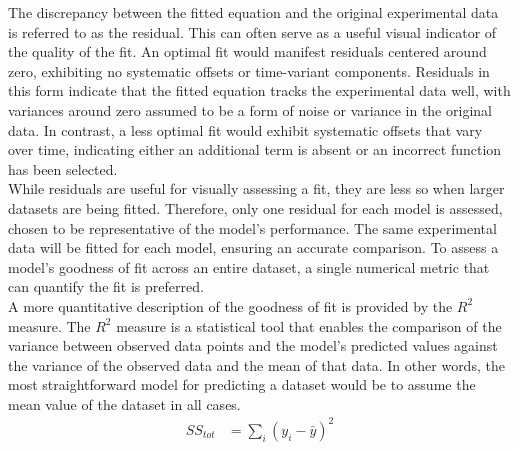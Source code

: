 \noindent The discrepancy between the fitted equation and the original experimental data is referred to as the residual. This can often serve as a useful visual indicator of the quality of the fit. An optimal fit would manifest residuals centered around zero, exhibiting no systematic offsets or time-variant components. Residuals in this form indicate that the fitted equation tracks the experimental data well, with variances around zero assumed to be a form of noise or variance in the original data. In contrast, a less optimal fit would exhibit systematic offsets that vary over time, indicating either an additional term is absent or an incorrect function has been selected.\\


\noindent While residuals are useful for visually assessing a fit, they are less so when larger datasets are being fitted. Therefore, only one residual for each model is assessed, chosen to be representative of the model's performance. The same experimental data will be fitted for each model, ensuring an accurate comparison. To assess a model's goodness of fit across an entire dataset, a single numerical metric that can quantify the fit is preferred.\\


\noindent A more quantitative description of the goodness of fit is provided by the $R^2$  measure. The $R^2$  measure is a statistical tool that enables the comparison of the variance between observed data points and the model's predicted values against the variance of the observed data and the mean of that data. In other words, the most straightforward model for predicting a dataset would be to assume the mean value of the dataset in all cases.\\
\begin{align}
SS_{tot} &= \sum_{i}\left( y_i - \bar y \right)^2 \label{eq:5.2} 
\end{align}

